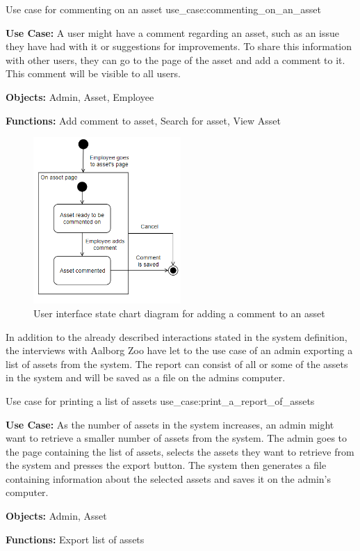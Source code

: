     {Use case for commenting on an asset}
    {use_case:commenting_on_an_asset}
    {
        \textbf{Use Case:} A user might have a comment regarding an asset, such as an issue they have had with it or suggestions for improvements. To share this information with other users, they can go to the page of the asset and add a comment to it. This comment will be visible to all users.
    
        \vskip 0.2cm
        
        \textbf{Objects:} Admin, Asset, Employee
        
        \vskip 0.2cm
        
        \textbf{Functions:} Add comment to asset, Search for asset, View Asset
    }

\begin{figure}[H]
    \centering
    \includegraphics[width=0.5\textwidth]{figures/UseCases/CommentAssetUseCase.png}
    \caption{User interface state chart diagram for adding a comment to an asset}
    \label{fig:add_comment_statechart}
\end{figure}

In addition to the already described interactions stated in the system definition, the interviews with Aalborg Zoo have let to the use case of an admin exporting a list of assets from the system. The report can consist of all or some of the assets in the system and will be saved as a file on the admins computer.

    {Use case for printing a list of assets}
    {use_case:print_a_report_of_assets}
    {
        \textbf{Use Case:} As the number of assets in the system increases, an admin might want to retrieve a smaller number of assets from the system. The admin goes to the page containing the list of assets, selects the assets they want to retrieve from the system and presses the export button. The system then generates a file containing information about the selected assets and saves it on the admin's computer.
    
        \vskip 0.2cm
        
        \textbf{Objects:} Admin, Asset
        
        \vskip 0.2cm
        
        \textbf{Functions:} Export list of assets
    }


